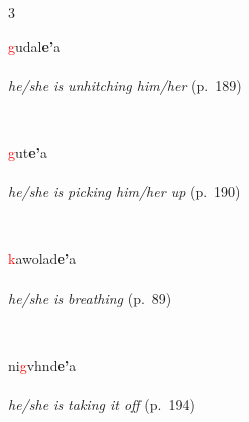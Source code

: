 \documentclass[oneside,openany]{book}%
\begin{document}
\begin{multicols}{3}
\begin{minipage}[t]{\linewidth}
\raggedright\noindent \textcolor{Red}{g}udal\textbf{e'}a\\
\\
\noindent \textit{he/she is unhitching him/her} (p.~189)
\end{minipage}\\[1em]%
\begin{minipage}[t]{\linewidth}
\raggedright\noindent \textcolor{Red}{g}ut\textbf{e'}a\\
\\
\noindent \textit{he/she is picking him/her up} (p.~190)
\end{minipage}\\[1em]%
\begin{minipage}[t]{\linewidth}
\raggedright\noindent \textcolor{Red}{k}awolad\textbf{e'}a\\
\\
\noindent \textit{he/she is breathing} (p.~89)
\end{minipage}\\[1em]%
\begin{minipage}[t]{\linewidth}
\raggedright\noindent ni\textcolor{Red}{g}vhnd\textbf{e'}a\\
\\
\noindent \textit{he/she is taking it off} (p.~194)
\end{minipage}\\[1em]%
\end{multicols}%
\vspace{1em}%
\needspace{1.5in}%
\end{document}
